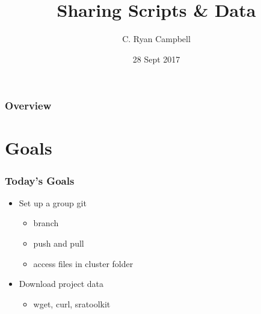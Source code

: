 \documentclass[14pt]{beamer}
\title[Git and SRA]{Sharing Scripts \& Data} %
\author{C. Ryan Campbell} %
\institute[Duke] %
{
Duke University \\ %
\medskip
\textit{c.ryan.campbell@duke.edu} %
}
\date{28 Sept 2017} %
\begin{document}
\begin{frame}
\titlepage %
\end{frame}

\begin{frame}
\frametitle{Overview} %
\tableofcontents %
\end{frame}


\section{Goals} %

\begin{frame}
\frametitle{Today's Goals}
\begin{itemize}
	\item<+-> Set up a group git
	\begin{itemize}
		\item<+-> branch
		\item<+-> push and pull
		\item<+-> access files in cluster folder 
	\end{itemize}
	\item<+-> Download project data
	\begin{itemize}
		\item<+-> wget, curl, sratoolkit
	\end{itemize}
\end{itemize}
\end{frame}
\end{document}
